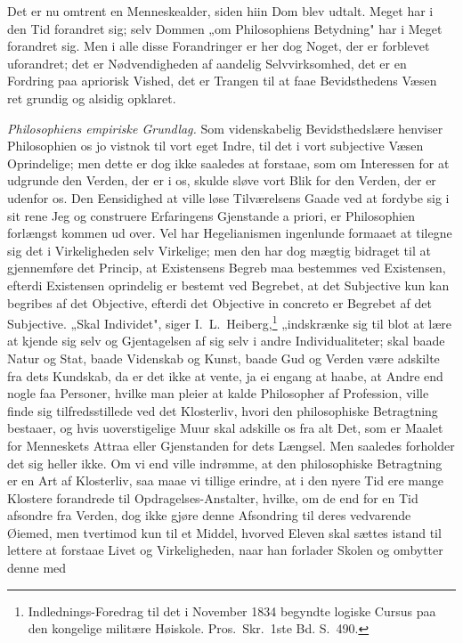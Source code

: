 \documentclass[12pt]{book}
\begin{document}
Det er nu omtrent en Menneskealder, siden hiin Dom blev udtalt. Meget har i den
Tid forandret sig; selv Dommen „om Philosophiens Betydning" har i Meget forandret
sig. Men i alle disse Forandringer er her dog Noget, der er forblevet uforandret;
det er Nødvendigheden af aandelig Selvvirksomhed, det er en Fordring paa apriorisk
Vished, det er Trangen til at faae Bevidsthedens Væsen ret grundig og alsidig
opklaret.

\emph{Philosophiens empiriske Grundlag.} Som videnskabelig Bevidsthedslære
henviser Philosophien os jo vistnok til vort eget Indre, til det i vort subjective
Væsen Oprindelige; men dette er dog ikke saaledes at forstaae, som om Interessen
for at udgrunde den Verden, der er i os, skulde sløve vort Blik for den Verden,
der er udenfor os. Den Eensidighed at ville løse Tilværelsens Gaade ved at
fordybe sig i sit rene Jeg og construere Erfaringens Gjenstande a priori, er
Philosophien forlængst kommen ud over. Vel har Hegelianismen ingenlunde formaaet
at tilegne sig det i Virkeligheden selv Virkelige; men den har dog mægtig bidraget
til at gjennemføre det Princip, at Existensens Begreb maa bestemmes ved
Existensen, efterdi Existensen oprindelig er bestemt ved Begrebet, at det
Subjective kun kan begribes af det Objective, efterdi det Objective in concreto er
Begrebet af det Subjective. „Skal Individet", siger I.\ L.\ Heiberg,\footnote{Indlednings-Foredrag
til det i November 1834 begyndte logiske Cursus paa den kongelige militære
Høiskole. Pros.\ Skr.\ 1ste Bd. S.~490.} „indskrænke sig til blot at lære at kjende
sig selv og Gjentagelsen af sig selv i andre Individualiteter; skal baade Natur og
Stat, baade Videnskab og Kunst, baade Gud og Verden være adskilte fra dets
Kundskab, da er det ikke at vente, ja ei engang at haabe, at Andre end nogle faa
Personer, hvilke man pleier at kalde Philosopher af Profession, ville finde sig
tilfredsstillede ved det Klosterliv, hvori den philosophiske Betragtning bestaaer,
og hvis uoverstigelige Muur skal adskille os fra alt Det, som er Maalet for
Menneskets Attraa eller Gjenstanden for dets Længsel. Men saaledes forholder det
sig heller ikke. Om vi end ville indrømme, at den philosophiske Betragtning er en
Art af Klosterliv, saa maae vi tillige erindre, at i den nyere Tid ere mange
Klostere forandrede til Opdragelses-Anstalter, hvilke, om de end for en Tid
afsondre fra Verden, dog ikke gjøre denne Afsondring til deres vedvarende Øiemed,
men tvertimod kun til et Middel, hvorved Eleven skal sættes istand til lettere at
forstaae Livet og Virkeligheden, naar han forlader Skolen og ombytter denne med
\end{document}
